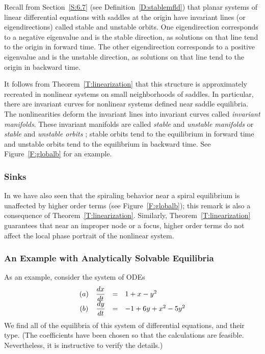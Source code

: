 \documentclass{ximera}
\begin{document}
Recall from Section~\ref{S:6.7} (see Definition~\ref{D:stablemfld})
that planar systems of linear differential equations with saddles at the 
origin have invariant lines (or eigendirections) called stable and unstable 
orbits.  One eigendirection corresponds to a negative eigenvalue and is 
the stable direction, as solutions on that line 
tend to the origin in forward time.
The other eigendirection corresponds to a positive eigenvalue 
and is the unstable direction, as solutions on 
that line tend to the origin in backward time.

It follows from Theorem~\ref{T:linearization} that this structure is
approximately recreated in nonlinear systems on small neighborhoods of
saddles.  In particular, there are invariant curves for nonlinear systems 
defined near saddle equilibria.  The nonlinearities deform the invariant 
lines into invariant curves called {\em invariant manifolds\/}.  
   These invariant manifolds 
are called {\em stable\/} and {\em unstable manifolds\/} or {\em stable\/} 
and {\em unstable orbits\/} ; 
stable orbits tend to the equilibrium in forward 
time and unstable orbits tend to the equilibrium in backward time.  See 
Figure~\ref{F:globalb} for an example. 

\subsubsection*{Sinks}   

In  we have also seen that the spiraling behavior near a
spiral equilibrium is unaffected by higher order terms (see
Figure~\ref{F:globalb}); this remark is also a consequence of
Theorem~\ref{T:linearization}. Similarly, Theorem~\ref{T:linearization} 
guarantees that near an improper node or a 
focus, higher order terms do not 
affect the local phase portrait of the nonlinear system.

\subsubsection*{An Example with Analytically Solvable Equilibria}

As an example, consider the system of ODEs
\arraystart
\begin{equation*} \label{e1:exer}
\begin{array}{crcl}
(a) & \displaystyle\frac{dx}{dt} & = & 1 + x - y^2  \\
(b) & \displaystyle\frac{dy}{dt} & = & -1 +6y + x^2 - 5y^2 
\end{array}
\end{equation*}
\arrayfinish
We find all of the equilibria of this system of differential
equations, and their type.  (The coefficients have been chosen
so that the calculations are feasible.  Nevertheless, it is
instructive to verify the details.)
\end{document}
